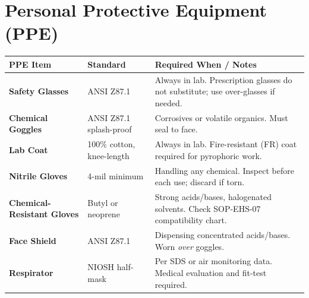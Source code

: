 \section{Personal Protective Equipment (PPE)}

\begin{tabularx}{\linewidth}{@{}>{\bfseries}l l >{\raggedright\arraybackslash}X@{}}
  \rowcolor{accent}
  \color{white}PPE Item & \color{white}Standard & \color{white}Required When / Notes \\
  \midrule
  Safety Glasses   & ANSI Z87.1              & Always in lab. Prescription glasses do not substitute; use over-glasses if needed. \\
  Chemical Goggles & ANSI Z87.1 splash-proof & Corrosives or volatile organics. Must seal to face. \\
  Lab Coat         & 100\% cotton, knee-length & Always in lab. Fire-resistant (FR) coat required for pyrophoric work. \\
  Nitrile Gloves   & 4-mil minimum           & Handling any chemical. Inspect before each use; discard if torn. \\
  Chemical-Resistant Gloves & Butyl or neoprene & Strong acids/bases, halogenated solvents. Check SOP-EHS-07 compatibility chart. \\
  Face Shield      & ANSI Z87.1              & Dispensing concentrated acids/bases. Worn \textit{over} goggles. \\
  Respirator       & NIOSH half-mask         & Per SDS or air monitoring data. Medical evaluation and fit-test required. \\
\end{tabularx}

